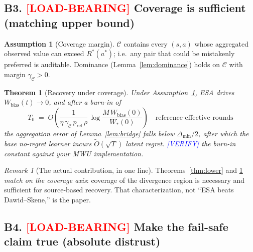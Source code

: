 \documentclass[11pt]{article}
\newtheorem{theorem}{Theorem}
\theoremstyle{definition}
\newtheorem{assumption}{Assumption}
\theoremstyle{remark}
\newtheorem{remark}{Remark}
\newcommand{\Rstar}{R^{\ast}}
\newcommand{\astar}{a^{\ast}}
\newcommand{\Cov}{\mathcal{C}}
\begin{document}
\subsection*{B3. \textcolor{red}{[LOAD-BEARING]} Coverage is sufficient (matching upper bound)}

\begin{assumption}[Coverage margin]
\label{ass:coverage}
$\Cov$ contains every $(s,a)$ whose aggregated observed value can exceed $\Rstar(\astar)$; i.e.\
any pair that could be mistakenly preferred is auditable. Dominance (Lemma~\ref{lem:dominance})
holds on $\Cov$ with margin $\gamma_{\Cov}>0$.
\end{assumption}

\begin{theorem}[Recovery under coverage]
\label{thm:upper}
Under Assumption~\ref{ass:coverage}, ESA drives $W_{\mathrm{bias}}(t)\to 0$, and after a burn-in of
\[
T_0 \;=\; O\!\left(\frac{1}{\eta\,\gamma_{\Cov}\,p_{\mathrm{ref}}\,\rho}\,
\log\frac{M\,W_{\mathrm{bias}}(0)}{W_{\ast}(0)}\right)
\quad\text{reference-effective rounds}
\]
the aggregation error of Lemma~\ref{lem:bridge} falls below $\Delta_{\min}/2$, after which the base
no-regret learner incurs $\tilde O(\sqrt{T})$ latent regret. \textcolor{blue}{[VERIFY]} the burn-in
constant against your MWU implementation.
\end{theorem}

\begin{remark}[The actual contribution, in one line]
Theorems~\ref{thm:lower} and \ref{thm:upper} \emph{match on the coverage axis}: coverage of the
divergence region is necessary and sufficient for source-based recovery. That characterization,
not ``ESA beats Dawid--Skene,'' is the paper.
\end{remark}

\subsection*{B4. \textcolor{red}{[LOAD-BEARING]} Make the fail-safe claim true (absolute distrust)}
\end{document}
